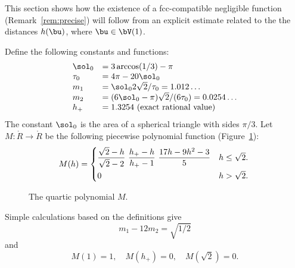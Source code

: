 This section shows how the existence of a fcc-compatible negligible
function (Remark~\ref{rem:precise})  will follow from an explicit
estimate related to the the distances $h(\bu)$, where $\bu\in \bV(1)$.


Define the following constants and functions: 
\begin{equation}\label{eqn:m-def}
\begin{array}{lll}
\sol_0 &= 3\arccos(1/3)-\pi\\
\tau_0 &= 4\pi  - 20\sol_0\\
m_1 &= \sol_0 2\sqrt2/\tau_0 = 1.012\ldots \\ %
m_2  &=  (6\sol_0- \pi)\sqrt2/(6 \tau_0) = 0.0254\ldots\\ %
h_+ &= 1.3254 \hbox{~(exact rational value)}
\end{array}
\end{equation}
The constant $\sol_0$
is the area of a spherical triangle with sides $\pi/3$.
Let $M:\ring{R}\to\ring{R}$ 
be the following piecewise polynomial function (Figure~\ref{fig:M}):
\begin{equation}\label{eqn:M}
M(h) =
\begin{cases}
\dfrac{\sqrt2-h}{\sqrt2-2}~ \dfrac{h_+-h}{h_+-1} ~\dfrac{17 h - 9 h^2 - 3}{5} & h \le \sqrt2.\vspace{3pt} \\
0 & h >\sqrt2.
\end{cases}
\\
\end{equation}
\begin{figure}[htb]
\centering
{}
\caption{The quartic polynomial $M$.}
\label{fig:M}
\end{figure}

Simple calculations based on the definitions give
\begin{equation}\label{eqn:km}m_1 - 12m_2 = \sqrt{1/2}\end{equation}
and
\begin{equation}M(1) = 1,\quad M(h_+)=0,\quad M(\sqrt2) =0.\end{equation}



